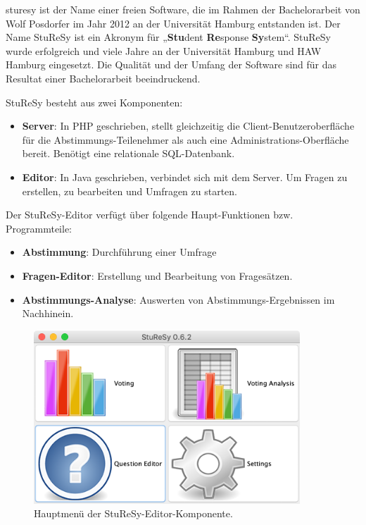 \ac{sturesy} ist der Name einer freien Software, die im Rahmen der Bachelorarbeit von Wolf Posdorfer im Jahr 2012 an der Universität Hamburg entstanden ist\cite{sturesy}. Der Name StuReSy ist ein Akronym für „\textbf{Stu}dent \textbf{Re}sponse \textbf{Sy}stem“. StuReSy wurde erfolgreich und viele Jahre an der Universität Hamburg und HAW Hamburg eingesetzt. Die Qualität und der Umfang der Software sind für das Resultat einer Bachelorarbeit beeindruckend.

StuReSy besteht aus zwei Komponenten:
\begin{itemize}
    \item \textbf{Server}: In PHP geschrieben, stellt gleichzeitig die Client-Benutzeroberfläche für die Abstimmungs-Teilenehmer als auch eine Administrations-Oberfläche bereit. Benötigt eine relationale SQL-Datenbank.
    \item \textbf{Editor}: In Java geschrieben, verbindet sich mit dem Server. Um Fragen zu erstellen, zu bearbeiten und Umfragen zu starten.
\end{itemize}

Der StuReSy-Editor verfügt über folgende Haupt-Funktionen bzw. Programmteile:
\begin{itemize}
    \item \textbf{Abstimmung}: Durchführung einer Umfrage
    \item \textbf{Fragen-Editor}: Erstellung und Bearbeitung von Fragesätzen.
    \item \textbf{Abstimmungs-Analyse}: Auswerten von Abstimmungs-Ergebnissen im Nachhinein.
\end{itemize}

\begin{figure}[H]
    \includegraphics[width=10cm]{chapter/bewertung/bilder/StuReSy_Hauptmenue.png}
    \centering
    \caption{Hauptmenü der StuReSy-Editor-Komponente.}
    \label{Abbildung 2.1}
\end{figure}


